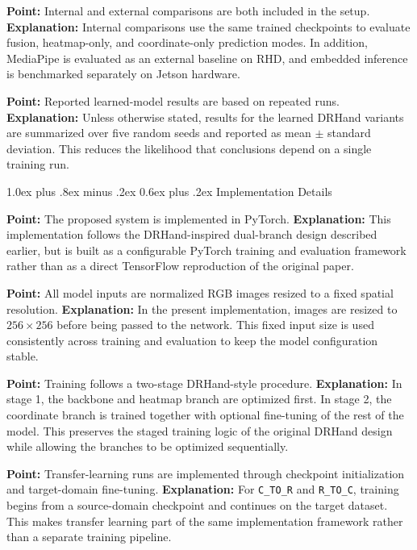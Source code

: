 \documentclass[10pt,letterpaper]{article}
\makeatletter
\renewcommand\subsection{\@startsection{subsection}{2}{\z@}%
  {1.0ex plus .8ex minus .2ex}%
  {0.6ex plus .2ex}%
  {\normalfont\itshape}}
\makeatother
\begin{document}
\medskip
\noindent\textbf{Point:} Internal and external comparisons are both included in the setup.  
\textbf{Explanation:} Internal comparisons use the same trained checkpoints to evaluate fusion, heatmap-only, and coordinate-only prediction modes. In addition, MediaPipe is evaluated as an external baseline on RHD, and embedded inference is benchmarked separately on Jetson hardware.

\medskip
\noindent\textbf{Point:} Reported learned-model results are based on repeated runs.  
\textbf{Explanation:} Unless otherwise stated, results for the learned DRHand variants are summarized over five random seeds and reported as mean $\pm$ standard deviation. This reduces the likelihood that conclusions depend on a single training run.

\subsection{Implementation Details}

\noindent\textbf{Point:} The proposed system is implemented in PyTorch.  
\textbf{Explanation:} This implementation follows the DRHand-inspired dual-branch design described earlier, but is built as a configurable PyTorch training and evaluation framework rather than as a direct TensorFlow reproduction of the original paper.

\medskip
\noindent\textbf{Point:} All model inputs are normalized RGB images resized to a fixed spatial resolution.  
\textbf{Explanation:} In the present implementation, images are resized to $256 \times 256$ before being passed to the network. This fixed input size is used consistently across training and evaluation to keep the model configuration stable.

\medskip
\noindent\textbf{Point:} Training follows a two-stage DRHand-style procedure.  
\textbf{Explanation:} In stage 1, the backbone and heatmap branch are optimized first. In stage 2, the coordinate branch is trained together with optional fine-tuning of the rest of the model. This preserves the staged training logic of the original DRHand design while allowing the branches to be optimized sequentially.

\medskip
\noindent\textbf{Point:} Transfer-learning runs are implemented through checkpoint initialization and target-domain fine-tuning.  
\textbf{Explanation:} For \texttt{C\_TO\_R} and \texttt{R\_TO\_C}, training begins from a source-domain checkpoint and continues on the target dataset. This makes transfer learning part of the same implementation framework rather than a separate training pipeline.
\end{document}
